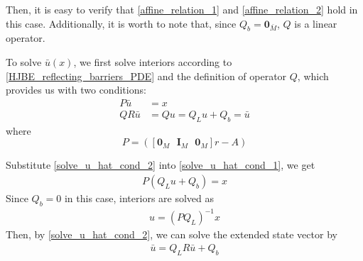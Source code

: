 \documentclass[11pt]{article}
\begin{document}
Then, it is easy to verify that \eqref{affine_relation_1} and \eqref{affine_relation_2} hold in this case. Additionally, it is worth to note that, since $Q_b = \mathbf{0}_{\bar{M}}$, $Q$ is a linear operator.

To solve $\bar{u}(x)$, we first solve interiors according to \eqref{HJBE_reflecting_barriers_PDE} and the definition of operator $Q$, which provides us with two conditions:
\begin{align}
P\bar{u} &= x\label{solve_u_hat_cond_1}\\
Q R\bar{u} &= Q u = Q_L u+Q_b = \bar{u}\label{solve_u_hat_cond_2}
\end{align}
where
\begin{equation}
P = ([\mathbf{0}_{M} \text{ } \mathbf{I}_{M} \text{ } \mathbf{0}_{M}] r - A)
\label{P_definition}
\end{equation}
\iffalse
\begin{align}
P &= \begin{bmatrix}
0&r&0&\cdots&0&0&0\\
0&0&r&\cdots&0&0&0\\
\vdots&\vdots&\vdots&\ddots&\vdots&\vdots&\vdots\\
0&0&0&\cdots&r&0&0\\
0&0&0&\cdots&0&r&0\\
\end{bmatrix}_{M\times\bar{M}}-A  \\
&= \begin{bmatrix}
-1&2(1+r\Delta^2)&-1&\dots&0&0&0\\
0&-1&2(1+r\Delta^2)&\dots&0&0&0\\
\vdots&\vdots&\vdots&\ddots&\vdots&\vdots&\vdots\\
0&0&0&\dots&2(1+r\Delta^2)&-1&0\\
0&0&0&\cdots&-1&2(1+r\Delta^2)&-1
\end{bmatrix}\frac{1}{2\Delta^{2}}
\end{align}
\fi
Substitute \eqref{solve_u_hat_cond_2} into \eqref{solve_u_hat_cond_1}, we get
\begin{align}
P(Q_L u+Q_b) = x
\end{align}
Since $Q_b = 0$ in this case, interiors are solved as
\begin{align}
u = (P Q_L)^{-1}x
\end{align}
Then, by \eqref{solve_u_hat_cond_2}, we can solve the extended state vector by
\begin{align}
\bar{u} = Q_L R\bar{u}+Q_b\label{solve_u_hat_in_terms_of_interiors}
\end{align}
\end{document}
